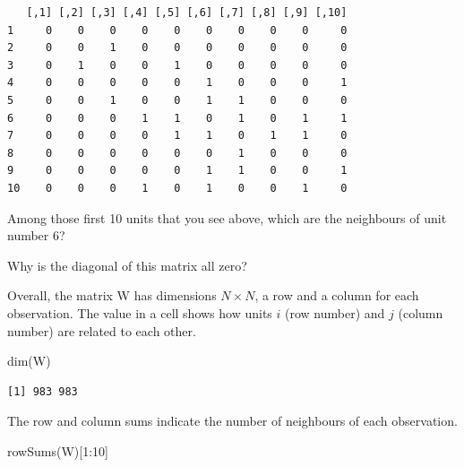 \documentclass[
  letterpaper,
  DIV=11,
  numbers=noendperiod]{scrreprt}
\newenvironment{Shaded}{\begin{snugshade}}{\end{snugshade}}
\newcommand{\DecValTok}[1]{\textcolor[rgb]{0.68,0.00,0.00}{#1}}
\newcommand{\FunctionTok}[1]{\textcolor[rgb]{0.28,0.35,0.67}{#1}}
\newcommand{\NormalTok}[1]{\textcolor[rgb]{0.00,0.23,0.31}{#1}}
\newcommand{\SpecialCharTok}[1]{\textcolor[rgb]{0.37,0.37,0.37}{#1}}
\begin{document}
\begin{verbatim}
   [,1] [,2] [,3] [,4] [,5] [,6] [,7] [,8] [,9] [,10]
1     0    0    0    0    0    0    0    0    0     0
2     0    0    1    0    0    0    0    0    0     0
3     0    1    0    0    1    0    0    0    0     0
4     0    0    0    0    0    1    0    0    0     1
5     0    0    1    0    0    1    1    0    0     0
6     0    0    0    1    1    0    1    0    1     1
7     0    0    0    0    1    1    0    1    1     0
8     0    0    0    0    0    0    1    0    0     0
9     0    0    0    0    0    1    1    0    0     1
10    0    0    0    1    0    1    0    0    1     0
\end{verbatim}

\begin{tcolorbox}[enhanced jigsaw, opacitybacktitle=0.6, left=2mm, leftrule=.75mm, toptitle=1mm, breakable, colback=white, bottomrule=.15mm, colframe=quarto-callout-tip-color-frame, colbacktitle=quarto-callout-tip-color!10!white, coltitle=black, bottomtitle=1mm, titlerule=0mm, title=\textcolor{quarto-callout-tip-color}{\faLightbulb}\hspace{0.5em}{Question}, opacityback=0, arc=.35mm, rightrule=.15mm, toprule=.15mm]

Among those first 10 units that you see above, which are the neighbours
of unit number 6?

Why is the diagonal of this matrix all zero?

\end{tcolorbox}

Overall, the matrix W has dimensions \(N \times N\), a row and a column
for each observation. The value in a cell shows how units \(i\) (row
number) and \(j\) (column number) are related to each other.

\begin{Shaded}
\begin{Highlighting}[]
\FunctionTok{dim}\NormalTok{(W)}
\end{Highlighting}
\end{Shaded}

\begin{verbatim}
[1] 983 983
\end{verbatim}

The row and column sums indicate the number of neighbours of each
observation.

\begin{Shaded}
\begin{Highlighting}[]
\FunctionTok{rowSums}\NormalTok{(W)[}\DecValTok{1}\SpecialCharTok{:}\DecValTok{10}\NormalTok{]}
\end{Highlighting}
\end{Shaded}
\end{document}
